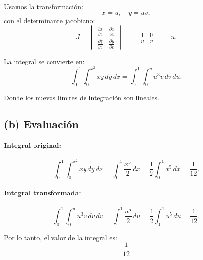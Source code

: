 Usamos la transformación:
\[
x = u, \quad y = uv,
\]
con el determinante jacobiano:
\[
J = \begin{vmatrix}
\frac{\partial x}{\partial u} & \frac{\partial x}{\partial v} \\
\frac{\partial y}{\partial u} & \frac{\partial y}{\partial v}
\end{vmatrix}
= \begin{vmatrix}
1 & 0 \\
v & u
\end{vmatrix} = u.
\]

La integral se convierte en:
\[
\int_0^1 \int_0^{x^2} xy \, dy \, dx = \int_0^1 \int_0^u u^3v \, dv \, du.
\]

Donde los nuevos límites de integración son lineales.

\subsection*{(b) Evaluación}
\paragraph{Integral original:}
\[
\int_0^1 \int_0^{x^2} xy \, dy \, dx = \int_0^1 \frac{x^5}{2} \, dx = \frac{1}{2} \int_0^1 x^5 \, dx = \frac{1}{12}.
\]

\paragraph{Integral transformada:}
\[
\int_0^1 \int_0^u u^3v \, dv \, du = \int_0^1 \frac{u^5}{2} \, du = \frac{1}{2} \int_0^1 u^5 \, du = \frac{1}{12}.
\]

Por lo tanto, el valor de la integral es:
\[
\boxed{\frac{1}{12}}
\]
